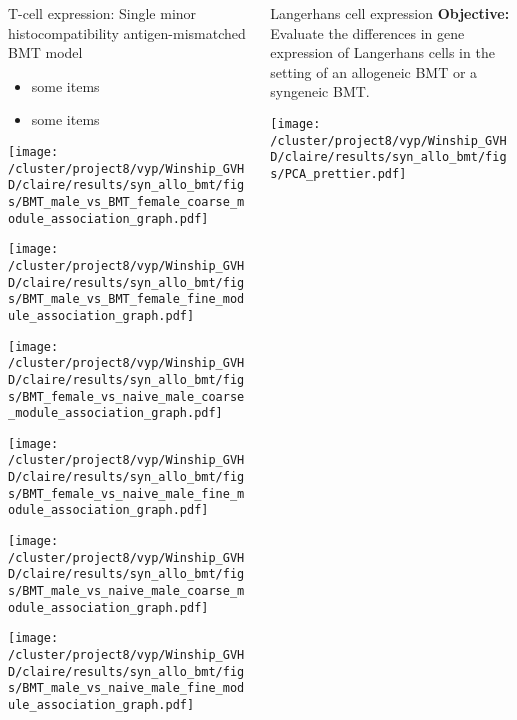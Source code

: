 \documentclass[final,hyperref={pdfpagelabels=false}]{beamer}
\begin{document}
\begin{frame}{}
\begin{columns}[t]
\begin{column}{.25\linewidth}
\begin{block}{T-cell expression: Single minor histocompatibility antigen-mismatched BMT model}
	  \begin{itemize}
	    \item some items
	    \item some items
	   \end{itemize}
	  \begin{minipage}{0.45\textwidth}
            \texttt{[image: /cluster/project8/vyp/Winship\_GVHD/claire/results/syn\_allo\_bmt/figs/BMT\_male\_vs\_BMT\_female\_coarse\_module\_association\_graph.pdf]}
          \end{minipage}

	   \begin{minipage}{0.45\textwidth}
            \texttt{[image: /cluster/project8/vyp/Winship\_GVHD/claire/results/syn\_allo\_bmt/figs/BMT\_male\_vs\_BMT\_female\_fine\_module\_association\_graph.pdf]}
          \end{minipage}
          \begin{minipage}{0.45\textwidth}
            \texttt{[image: /cluster/project8/vyp/Winship\_GVHD/claire/results/syn\_allo\_bmt/figs/BMT\_female\_vs\_naive\_male\_coarse\_module\_association\_graph.pdf]}
          \end{minipage}
	  \begin{minipage}{0.45\textwidth}
            \texttt{[image: /cluster/project8/vyp/Winship\_GVHD/claire/results/syn\_allo\_bmt/figs/BMT\_female\_vs\_naive\_male\_fine\_module\_association\_graph.pdf]}
          \end{minipage}
          \begin{minipage}{0.45\textwidth}
            \texttt{[image: /cluster/project8/vyp/Winship\_GVHD/claire/results/syn\_allo\_bmt/figs/BMT\_male\_vs\_naive\_male\_coarse\_module\_association\_graph.pdf]}
          \end{minipage}
	  \begin{minipage}{0.45\textwidth}
            \texttt{[image: /cluster/project8/vyp/Winship\_GVHD/claire/results/syn\_allo\_bmt/figs/BMT\_male\_vs\_naive\_male\_fine\_module\_association\_graph.pdf]}
          \end{minipage}
        \end{block}
      \end{column}


      \begin{column}{.25\linewidth}
        \begin{block}{Langerhans cell expression}
	  {\bf Objective:} Evaluate the differences in gene expression of Langerhans cells in the setting of an allogeneic BMT or a syngeneic BMT.
           \begin{center}
           \texttt{[image: /cluster/project8/vyp/Winship\_GVHD/claire/results/syn\_allo\_bmt/figs/PCA\_prettier.pdf]}
          \end{center}


\end{block}
\end{column}
\end{columns}
\end{frame}
\end{document}

